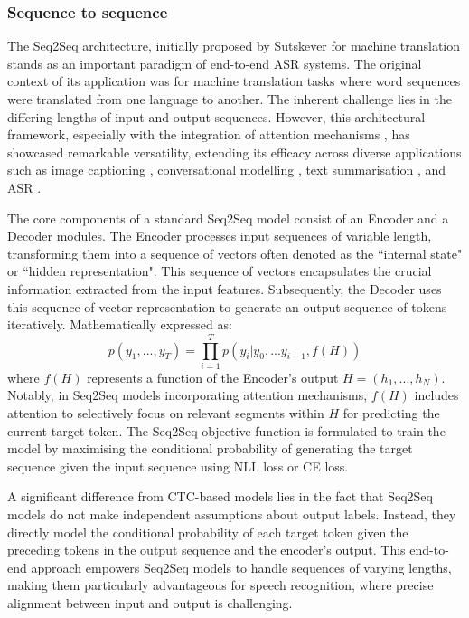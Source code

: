 \subsubsection{Sequence to sequence}
The \ac{Seq2Seq} architecture, initially proposed by Sutskever for machine translation \cite{sutskever2014sequence} stands as an important paradigm of end-to-end \ac{ASR} systems. The original context of its application was for machine translation tasks where word sequences were translated from one language to another. The inherent challenge lies in the differing lengths of input and output sequences. However, this architectural framework, especially with the integration of attention mechanisms \cite{bahdanau2014neural}, has showcased remarkable versatility, extending its efficacy across diverse applications such as image captioning \cite{seq2seq_imagecaption}, conversational modelling \cite{vinyals2015neural}, text summarisation \cite{nallapati2016abstractive}, and \ac{ASR} \cite{dong2018speech}.

The core components of a standard \ac{Seq2Seq} model consist of an Encoder and a Decoder modules. The Encoder processes input sequences of variable length, transforming them into a sequence of vectors often denoted as the ``internal state" or ``hidden representation". This sequence of vectors encapsulates the crucial information extracted from the input features. Subsequently, the Decoder uses this sequence of vector representation to generate an output sequence of tokens iteratively. Mathematically expressed as:
\begin{equation}
    p(y_1,...,y_T) = \prod_{i=1}^{T} p(y_i| y_0,...y_{i-1}, f(H))
\end{equation}
where $f(H)$ represents a function of the Encoder's output $H = (h_1, ..., h_N)$. Notably, in \ac{Seq2Seq} models incorporating attention mechanisms, $f(H)$ includes attention to selectively focus on relevant segments within $H$ for predicting the current target token. The \ac{Seq2Seq} objective function is formulated to train the model by maximising the conditional probability of generating the target sequence given the input sequence using \ac{NLL} loss or \ac{CE} loss.

A significant difference from \ac{CTC}-based models lies in the fact that \ac{Seq2Seq} models do not make independent assumptions about output labels. Instead, they directly model the conditional probability of each target token given the preceding tokens in the output sequence and the encoder's output. This end-to-end approach empowers \ac{Seq2Seq} models to handle sequences of varying lengths, making them particularly advantageous for speech recognition, where precise alignment between input and output is challenging.


